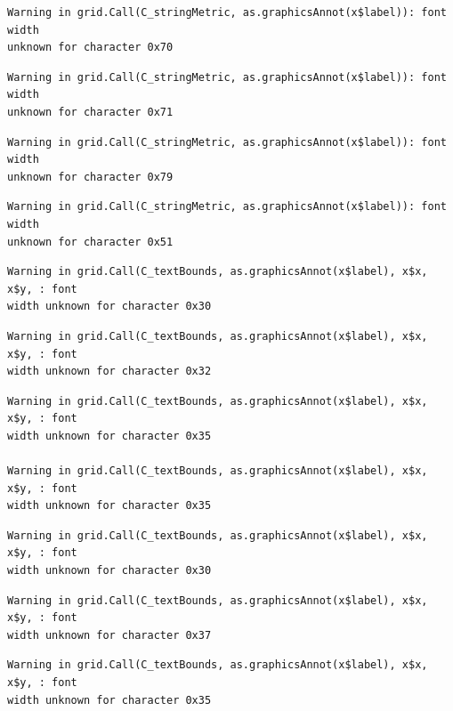 \documentclass[
  letterpaper,
  DIV=11,
  numbers=noendperiod]{scrreprt}
\begin{document}
\begin{verbatim}
Warning in grid.Call(C_stringMetric, as.graphicsAnnot(x$label)): font width
unknown for character 0x70
\end{verbatim}

\begin{verbatim}
Warning in grid.Call(C_stringMetric, as.graphicsAnnot(x$label)): font width
unknown for character 0x71
\end{verbatim}

\begin{verbatim}
Warning in grid.Call(C_stringMetric, as.graphicsAnnot(x$label)): font width
unknown for character 0x79
\end{verbatim}

\begin{verbatim}
Warning in grid.Call(C_stringMetric, as.graphicsAnnot(x$label)): font width
unknown for character 0x51
\end{verbatim}

\begin{verbatim}
Warning in grid.Call(C_textBounds, as.graphicsAnnot(x$label), x$x, x$y, : font
width unknown for character 0x30
\end{verbatim}

\begin{verbatim}
Warning in grid.Call(C_textBounds, as.graphicsAnnot(x$label), x$x, x$y, : font
width unknown for character 0x32
\end{verbatim}

\begin{verbatim}
Warning in grid.Call(C_textBounds, as.graphicsAnnot(x$label), x$x, x$y, : font
width unknown for character 0x35

Warning in grid.Call(C_textBounds, as.graphicsAnnot(x$label), x$x, x$y, : font
width unknown for character 0x35
\end{verbatim}

\begin{verbatim}
Warning in grid.Call(C_textBounds, as.graphicsAnnot(x$label), x$x, x$y, : font
width unknown for character 0x30
\end{verbatim}

\begin{verbatim}
Warning in grid.Call(C_textBounds, as.graphicsAnnot(x$label), x$x, x$y, : font
width unknown for character 0x37
\end{verbatim}

\begin{verbatim}
Warning in grid.Call(C_textBounds, as.graphicsAnnot(x$label), x$x, x$y, : font
width unknown for character 0x35
\end{verbatim}
\end{document}
